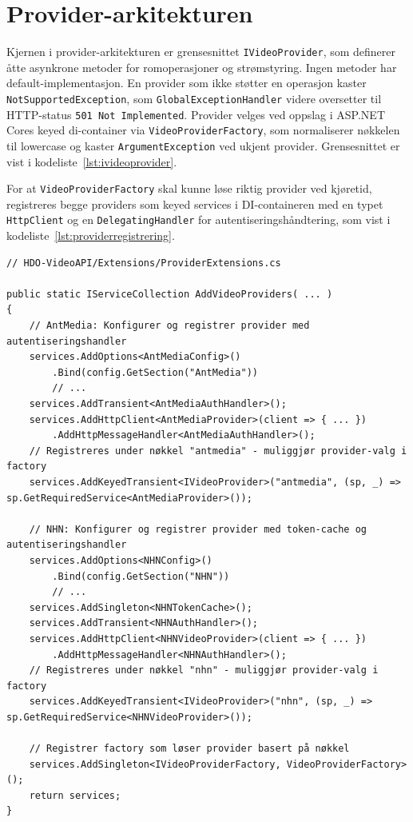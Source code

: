 \section{Provider-arkitekturen}
\label{sec:providers}

Kjernen i provider-arkitekturen er grensesnittet \texttt{IVideoProvider},
som definerer åtte asynkrone metoder for romoperasjoner og
strømstyring. Ingen metoder har default-implementasjon. En provider som
ikke støtter en operasjon kaster \texttt{NotSupportedException}, som
\texttt{GlobalExceptionHandler} videre oversetter til HTTP-status \texttt{501 Not Implemented}. Provider velges
ved oppslag i ASP.NET Cores keyed \gls{di}-container via
\texttt{VideoProviderFactory}, som normaliserer nøkkelen til lowercase og
kaster \texttt{ArgumentException} ved ukjent provider. Grensesnittet er vist i kodeliste~\ref{lst:ivideoprovider}.

For at \texttt{VideoProviderFactory} skal kunne løse riktig provider ved kjøretid, registreres begge providers som keyed services i DI-containeren med en typet \texttt{HttpClient} og en \texttt{DelegatingHandler} for autentiseringshåndtering, som vist i kodeliste~\ref{lst:providerregistrering}.

\begin{lstlisting}[language={[Sharp]C}, label=lst:providerregistrering,
  caption={Registrering av providers som keyed services.}]
// HDO-VideoAPI/Extensions/ProviderExtensions.cs

public static IServiceCollection AddVideoProviders( ... )
{
    // AntMedia: Konfigurer og registrer provider med autentiseringshandler
    services.AddOptions<AntMediaConfig>()
        .Bind(config.GetSection("AntMedia"))
        // ...
    services.AddTransient<AntMediaAuthHandler>();
    services.AddHttpClient<AntMediaProvider>(client => { ... })
        .AddHttpMessageHandler<AntMediaAuthHandler>();
    // Registreres under nøkkel "antmedia" - muliggjør provider-valg i factory
    services.AddKeyedTransient<IVideoProvider>("antmedia", (sp, _) => sp.GetRequiredService<AntMediaProvider>());

    // NHN: Konfigurer og registrer provider med token-cache og autentiseringshandler
    services.AddOptions<NHNConfig>()
        .Bind(config.GetSection("NHN"))
        // ...
    services.AddSingleton<NHNTokenCache>();
    services.AddTransient<NHNAuthHandler>();
    services.AddHttpClient<NHNVideoProvider>(client => { ... })
        .AddHttpMessageHandler<NHNAuthHandler>();
    // Registreres under nøkkel "nhn" - muliggjør provider-valg i factory
    services.AddKeyedTransient<IVideoProvider>("nhn", (sp, _) => sp.GetRequiredService<NHNVideoProvider>());

    // Registrer factory som løser provider basert på nøkkel
    services.AddSingleton<IVideoProviderFactory, VideoProviderFactory>();
    return services;
}
\end{lstlisting}

